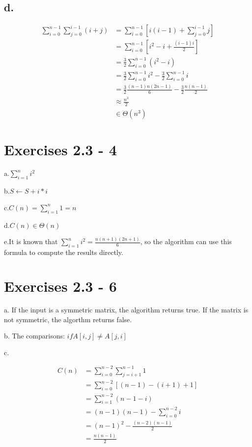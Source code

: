 \documentclass{article}
\begin{document}
\subsection{d.}

\begin{align*}
\sum_{i=0}^{n-1}\sum_{j=0}^{i-1}(i+j)&= \sum_{i=0}^{n-1}[i(i-1) + \sum_{j=0}^{i-1}j] \\
&= \sum_{i=0}^{n-1}[i^2 -i + \frac{(i-1)i}{2}]\\
&= \frac{3}{2}\sum_{i=0}^{n-1}(i^2 -i)\\
&= \frac{3}{2}\sum_{i=0}^{n-1}i^2 - \frac{3}{2}\sum_{i=0}^{n-1}i\\
&= \frac{3}{2}\frac{(n-1)n(2n-1)}{6} - \frac{3}{2}\frac{n(n-1)}{2}\\
&\approx \frac{n^3}{2}\\
&\in \Theta(n^3)
\end{align*}

\section{Exercises 2.3 - 4}

a.$\sum_{i=1}^{n}i^2$

b.$S \leftarrow S+ i*i$

c.$C(n) = \sum_{i=1}^n1=n$

d.$C(n) \in \Theta(n)$

e.It is known that $\sum_{i=1}^{n}i^2 = \frac{n(n+1)(2n+1)}{6}$, so the algorithm can use this formula to compute the results directly.


\section{Exercises 2.3 - 6}

a. If the input is a symmetric matrix, the algorithm returns true. If the matrix is not symmetric, the algorthm returns false.

b. The comparisons: $if A[i, j ] \ne A[j, i]$

c.

\begin{align*}
C(n) &= \sum_{i=0}^{n-2}\sum_{j=i+1}^{n-1}1\\
&= \sum_{i=0}^{n-2}[(n-1)-(i+1)+1]\\
&= \sum_{i=1}^{n-2}(n-1-i)\\
&= (n-1)(n-1) - \sum_{i=0}^{n-2}i\\
&= (n-1)^2 - \frac{(n-2)(n-1)}{2}\\
&= \frac{n(n-1)}{2}
\end{align*}
\end{document}
